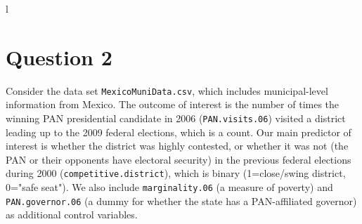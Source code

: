 l\documentclass[12pt,letterpaper]{article}
\begin{document}
\section*{Question 2} 
\vspace{.25cm}

\noindent Consider the data set \texttt{MexicoMuniData.csv}, which includes municipal-level information from Mexico. The outcome of interest is the number of times the winning PAN presidential candidate in 2006 (\texttt{PAN.visits.06}) visited a district leading up to the 2009 federal elections, which is a count. Our main predictor of interest is whether the district was highly contested, or whether it was not (the PAN or their opponents have electoral security) in the previous federal elections during 2000 (\texttt{competitive.district}), which is binary (1=close/swing district, 0="safe seat"). We also include \texttt{marginality.06} (a measure of poverty) and \texttt{PAN.governor.06} (a dummy for whether the state has a PAN-affiliated governor) as additional control variables. 
\end{document}
